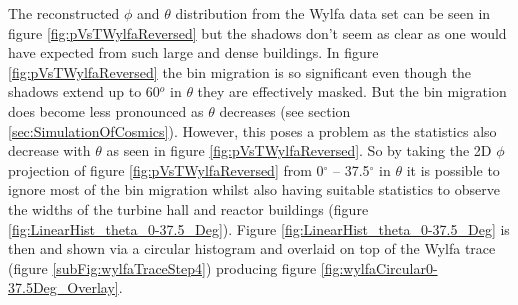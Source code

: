 The reconstructed $\phi$ and $\theta$ distribution from the Wylfa data set can be seen in figure \ref{fig:pVsTWylfaReversed} but the shadows don't seem as clear as one would have expected from such large and dense buildings. In figure \ref{fig:pVsTWylfaReversed} the bin migration is so significant even though the shadows extend up to 60$^o$ in $\theta$ they are effectively masked. But the bin migration does become less pronounced as $\theta$ decreases (see section \ref{sec:SimulationOfCosmics}). However, this poses a problem as the statistics also decrease with $\theta$ as seen in figure \ref{fig:pVsTWylfaReversed}. So by taking the 2D $\phi$ projection of figure \ref{fig:pVsTWylfaReversed} from 0$^\circ$ -- 37.5$^\circ$ in $\theta$ it is possible to ignore most of the bin migration whilst also having suitable statistics to observe the widths of the turbine hall and reactor buildings (figure \ref{fig:LinearHist_theta_0-37.5_Deg}). Figure \ref{fig:LinearHist_theta_0-37.5_Deg} is then and shown via a circular histogram and overlaid on top of the Wylfa trace (figure \ref{subFig:wylfaTraceStep4}) producing figure \ref{fig:wylfaCircular0-37.5Deg_Overlay}. 

